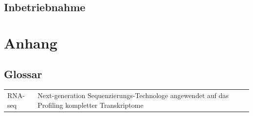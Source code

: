 \documentclass[a4paper]{thesis}
\begin{document}
\subsection{Inbetriebnahme}

\section{Anhang}

\subsection{Glossar}

\begin{tabularx}{\textwidth}{lX}
	  RNA-seq
	& Next-generation Sequenzierungs-Technologe angewendet auf
          das Profiling kompletter Transkriptome
\\
\end{tabularx}

{
	\renewcommand\listfigurename{Abbildungsverzeichnis}
	\tocsection{}\listoffigures
}

\nocite{*}
\printbibliography[
	title=Quellenverzeichnis,
	heading=subbibnumbered,
]
\end{document}

